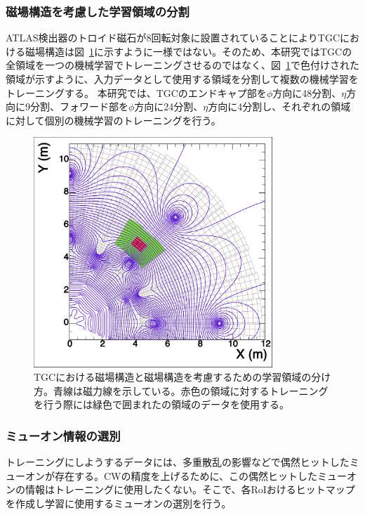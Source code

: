 \subsubsection{磁場構造を考慮した学習領域の分割}
ATLAS検出器のトロイド磁石が8回転対象に設置されていることによりTGCにおける磁場構造は図~\ref{fig:Mag}に示すように一様ではない。そのため、本研究ではTGCの全領域を一つの機械学習でトレーニングさせるのではなく、図~\ref{fig:Mag}で色付けされた領域が示すように、入力データとして使用する領域を分割して複数の機械学習をトレーニングする。
本研究では、TGCのエンドキャプ部を$\phi$方向に48分割、$\eta$方向に9分割、フォワード部を$\phi$方向に24分割、$\eta$方向に4分割し、それぞれの領域に対して個別の機械学習のトレーニングを行う。
\begin{figure}[tb]
  \centering
  \includegraphics[bb=2 3 555 540,clip, width=9cm]{fig/4/c1_withMag.pdf}
  \caption{TGCにおける磁場構造と磁場構造を考慮するための学習領域の分け方。青線は磁力線を示している。赤色の領域に対するトレーニングを行う際には緑色で囲まれたの領域のデータを使用する。}
  \label{fig:Mag}
\end{figure}

\subsubsection{ミューオン情報の選別}
トレーニングにしようするデータには、多重散乱の影響などで偶然ヒットしたミューオンが存在する。CWの精度を上げるために、この偶然ヒットしたミューオンの情報はトレーニングに使用したくない。そこで、各RoIおけるヒットマップを作成し学習に使用するミューオンの選別を行う。

